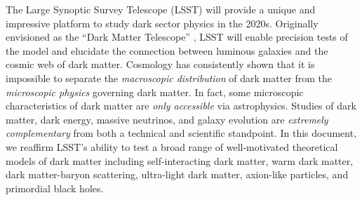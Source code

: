 \documentclass[12pt]{article}
\begin{document}
The Large Synoptic Survey Telescope (LSST) will provide a unique and impressive platform to study dark sector physics in the 2020s.
Originally envisioned as the ``Dark Matter Telescope'' \citep{Tyson:2001}, LSST will enable precision tests of the \LCDM model and elucidate the connection between luminous galaxies and the cosmic web of dark matter. 
Cosmology has consistently shown that it is impossible to separate the \emph{macroscopic distribution} of dark matter from the \emph{microscopic physics} governing dark matter.
In fact, some microscopic characteristics of dark matter are \emph{only accessible} via astrophysics.
Studies of dark matter, dark energy, massive neutrinos, and galaxy evolution are \emph{extremely complementary} from both a technical and scientific standpoint. 
In this document, we reaffirm LSST's ability to test a broad range of well-motivated theoretical models of dark matter including self-interacting dark matter, warm dark matter, dark matter-baryon scattering, ultra-light dark matter, axion-like particles, and primordial black holes. 
\end{document}
